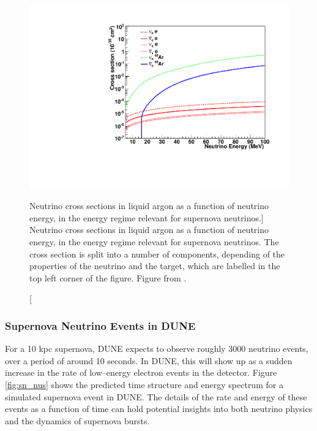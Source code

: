 \begin{figure}
	\centering
	\includegraphics[width=\textwidth]{figures/sn_xsec.pdf}
	\caption
	[Neutrino cross sections in liquid argon as a function of neutrino energy, in
	the energy regime relevant for supernova neutrinos.]
	{Neutrino cross sections in liquid argon as a function of neutrino energy, in 
	the energy regime relevant for supernova neutrinos. The cross
	section is split into a number of components, depending of the properties of
	the neutrino and the target, which are labelled in the top left corner of the 
	figure. Figure from \cite{Abi:2020evt}.}
	\label{fig:sn_xsec}
\end{figure}

\subsubsection{Supernova Neutrino Events in DUNE}

For a 10 kpc supernova, DUNE expects to observe roughly 3000 neutrino events,
over a period of around 10 seconds. In DUNE, this will show up as a sudden
increase in the rate of low--energy electron events in the detector. Figure 
\ref{fig:sn_nus} shows the predicted time structure and energy spectrum for a 
simulated supernova event in DUNE\cite{Abi:2020evt}. The details of the rate 
and energy of these events as a function of time can hold potential insights 
into both neutrino physics and the dynamics of supernova bursts. 

